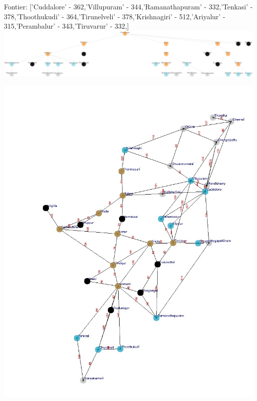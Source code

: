\documentclass[xcolor=table]{beamer}
\begin{document}
\begin{frame}
  { \tiny Fontier: ['Cuddalore' - 362,'Villupuram' - 344,'Ramanathapuram' - 332,'Tenkasi' - 378,'Thoothukudi' - 364,'Tirunelveli' - 378,'Krishnagiri' - 512,'Ariyalur' - 315,'Perambalur' - 343,'Tiruvarur' - 332,]}
  \includegraphics[width=1\textwidth]{../UCSNodes/25-1.png}
  \begin{center}
    \includegraphics[height=0.6\textheight]{../UCSoutput/tamilUCS23.jpg}
  \end{center}
\end{frame}
\end{document}
